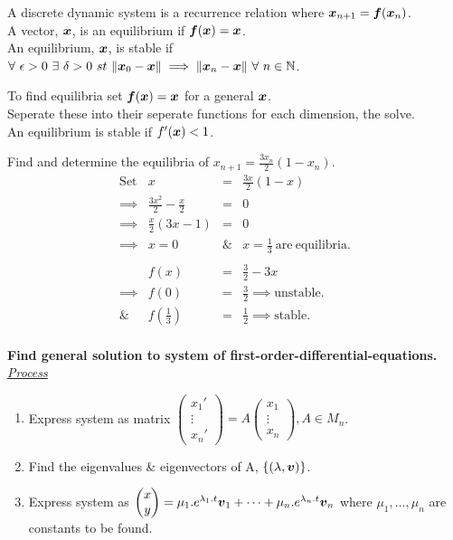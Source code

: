 \documentclass[11pt,a4paper]{article}
\begin{document}
\subtitle{Theory}
A discrete dynamic system is a recurrence relation where $\boldsymbol{x}_{n+1} = \boldsymbol{f}(\boldsymbol{x}_n)$.\\
A vector, $\boldsymbol{x}$, is an equilibrium if $\boldsymbol{f}(\boldsymbol{x}) = \boldsymbol{x}$.\\
An equilibrium, $\boldsymbol{x}$, is stable if\\
\-\hspace{2em} $\forall\ \epsilon > 0\ \exists\ \delta > 0\ st\ \|\boldsymbol{x}_0 - \boldsymbol{x}\| \implies \|\boldsymbol{x}_n - \boldsymbol{x}\|\ \forall\ n \in \mathbb{N}$.\\

\subtitle{Process}
To find equilibria set $\boldsymbol{f}(\boldsymbol{x}) = \boldsymbol{x}$ for a general $\boldsymbol{x}$.\\
Seperate these into their seperate functions for each dimension, the solve.\\
An equilibrium is stable if $f'(\boldsymbol{x}) < 1$.\\

\subtitle{Example}
Find and determine the equilibria of $x_{n+1} = \frac{3x_n}{2}(1-x_n)$.\\
\[\begin{array}{rrcl}
\mathrm{Set}& x &=& \frac{3x}{2}(1-x)\\
\implies& \frac{3x^2}{2} - \frac{x}{2} &=& 0\\
\implies& \frac{x}{2}(3x-1) &=& 0\\
\implies& x=0 &\&& x = \frac{1}{3} \mathrm{\ are\ equilibria.}\\
\\&f(x) &=& \frac{3}{2}-3x\\
\implies& f(0) &=& \frac{3}{2} \implies \mathrm{unstable}.\\
\&& f(\frac{1}{3}) &=& \frac{1}{2} \implies \mathrm{stable}.
\end{array}\] \\

\textbf{Find general solution to system of first-order-differential-equations.}\\

\textit{\underline{Process}}
\begin{enumerate}[label=\roman*)]
  \item Express system as matrix $\begin{pmatrix}x_1' \\ \vdots \\ x_n'\end{pmatrix}=A\begin{pmatrix}x_1 \\ \vdots \\ x_n\end{pmatrix}, A \in M_n$.
  \item Find the eigenvalues \& eigenvectors of A, $\{(\lambda, \boldsymbol{v})\}$.
  \item Express system as $\begin{pmatrix} x \\ y \end{pmatrix} = \mu_1.e^{\lambda_1.t}\boldsymbol{v}_1 + \dots + \mu_n.e^{\lambda_n.t}\boldsymbol{v}_n$ where $\mu_1, \dots, \mu_n$ are constants to be found.
\end{enumerate}
\end{document}
